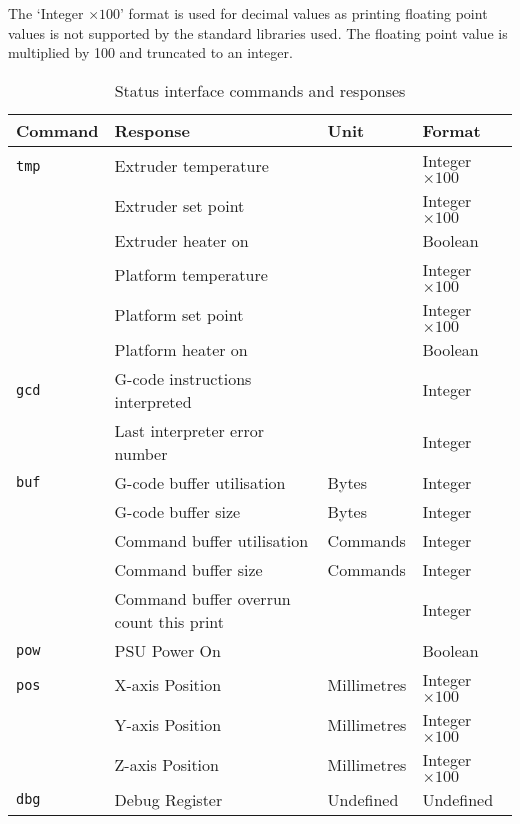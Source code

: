 		The `Integer $\times100$' format is used for decimal values as printing
		floating point values is not supported by the standard libraries used. The
		floating point value is multiplied by 100 and truncated to an integer.
		
		\begin{table}
			\centering
			\begin{tabular}{l l l l}
				\toprule
				Command & Response & Unit & Format \\
				\midrule
				\verb|tmp| & Extruder temperature & \dC & Integer $\times100$ \\
				           & Extruder set point   & \dC & Integer $\times100$ \\
				           & Extruder heater on   &     & Boolean \\
				           & Platform temperature & \dC & Integer $\times100$ \\
				           & Platform set point   & \dC & Integer $\times100$ \\
				           & Platform heater on   &     & Boolean \\
				\addlinespace
				\verb|gcd| & G-code instructions interpreted & & Integer \\
				           & Last interpreter error number &  & Integer \\
				\addlinespace
				\verb|buf| & G-code buffer utilisation & Bytes & Integer \\
				           & G-code buffer size & Bytes & Integer \\
				           & Command buffer utilisation & Commands & Integer \\
				           & Command buffer size & Commands & Integer \\
				           & Command buffer overrun count this print & & Integer \\
				\addlinespace
				\verb|pow| & PSU Power On & & Boolean \\
				\addlinespace
				\verb|pos| & X-axis Position & Millimetres & Integer $\times100$ \\
				           & Y-axis Position & Millimetres & Integer $\times100$ \\
				           & Z-axis Position & Millimetres & Integer $\times100$ \\
				\addlinespace
				\verb|dbg| & Debug Register & Undefined & Undefined \\
				\bottomrule
			\end{tabular}
			
			\caption{Status interface commands and responses}
			\label{tab:statuscmds}
		\end{table}
